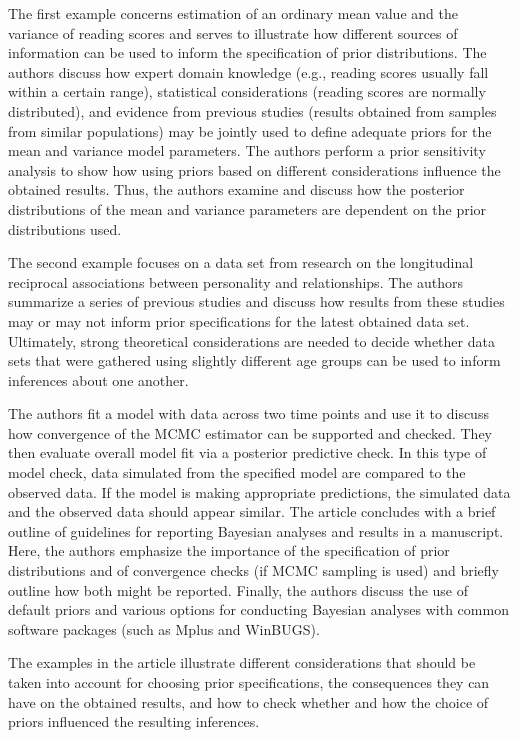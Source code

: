 The first example concerns estimation of an ordinary mean value and the variance of reading scores and serves to illustrate how different sources of information can be used to inform the specification of prior distributions. The authors discuss how expert domain knowledge (e.g., reading scores usually fall within a certain range), statistical considerations (reading scores are normally distributed), and evidence from previous studies (results obtained from samples from similar populations) may be jointly used to define adequate priors for the mean and variance model parameters. The authors perform a prior sensitivity analysis to show how using priors based on different considerations influence the obtained results. Thus, the authors examine and discuss how the posterior distributions of the mean and variance parameters are dependent on the prior distributions used.

The second example focuses on a data set from research on the longitudinal reciprocal associations between personality and relationships. The authors summarize a series of previous studies and discuss how results from these studies may or may not inform prior specifications for the latest obtained data set. Ultimately, strong theoretical considerations are needed to decide whether data sets that were gathered using slightly different age groups can be used to inform inferences about one another.

The authors fit a model with data across two time points and use it to discuss how convergence of the MCMC estimator can be supported and checked.  They then evaluate overall model fit via a posterior predictive check. In this type of model check, data simulated from the specified model are compared to the observed data. If the model is making appropriate predictions, the simulated data and the observed data should appear similar. The article concludes with a brief outline of guidelines for reporting Bayesian analyses and results in a manuscript. Here, the authors emphasize the importance of the specification of prior distributions and of convergence checks (if MCMC sampling is used) and briefly outline how both might be reported. Finally, the authors discuss the use of default priors and various options for conducting Bayesian analyses with common software packages (such as Mplus and WinBUGS).

The examples in the article illustrate different considerations that should be taken into account for choosing prior specifications, the consequences they can have on the obtained results, and how to check whether and how the choice of priors influenced the resulting inferences.

